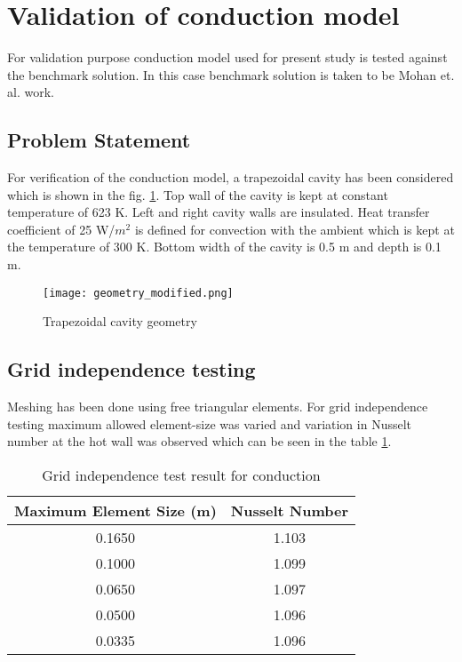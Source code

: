 \section{Validation of conduction model}\label{sec:validationConduction}
For validation purpose conduction model used for present study is tested against the benchmark solution. In this case benchmark solution is taken to be Mohan et. al.\citep{MOHAN201837} work.
\subsection{Problem Statement}
For verification of the conduction model, a trapezoidal cavity has been considered which is shown in the fig. \ref{geometry_modified}. Top wall of the cavity is kept at constant temperature of 623 K. Left and right cavity walls are insulated. Heat transfer coefficient of 25 W/$m^2$ is defined for convection with the ambient which is kept at the temperature of 300 K. Bottom width of the cavity is 0.5 m and depth is 0.1 m.

\begin{figure}[H]
\begin{center}
\texttt{[image: geometry\_modified.png]}
\caption{Trapezoidal cavity geometry}
\label{geometry_modified}
\end{center}
\end{figure}
\subsection{Grid independence testing}
Meshing has been done using free triangular elements. For grid independence testing	maximum allowed element-size was varied and variation in Nusselt number at the hot wall was observed which can be seen in the table \ref{gridTestCond}. 


\begin{table}[H]
\centering
\caption{Grid independence test result for conduction}
\label{gridTestCond}
\begin{tabular}{@{}|c|c|@{}}
\toprule
\textbf{Maximum Element Size (m)} & \textbf{Nusselt Number} \\ \midrule
0.1650                             & 1.103                  \\ \midrule
0.1000                            & 1.099                  \\ \midrule
0.0650                            & 1.097                  \\ \midrule
0.0500                            & 1.096                  \\ \midrule
0.0335                            & 1.096                  \\ \bottomrule
\end{tabular}
\end{table}

